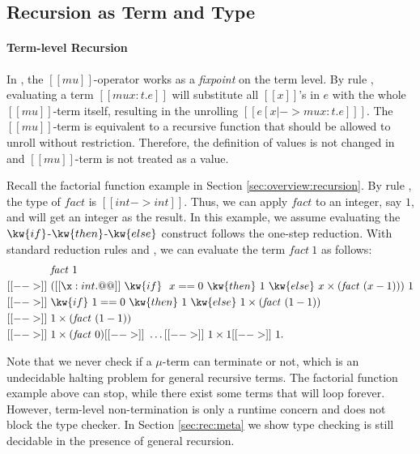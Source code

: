 \subsection{Recursion as Term and Type}
\label{sec:rec:recur}
\paragraph{Term-level Recursion}

In \name, the $[[mu]]$-operator works as a \emph{fixpoint} on the term
level. By rule , evaluating a term $[[mu x:t.e]]$ will
substitute all $[[x]]$'s in $e$ with the whole $[[mu]]$-term itself,
resulting in the unrolling $[[e [x |-> mu x:t.e] ]]$. The
$[[mu]]$-term is equivalent to a recursive function that should be
allowed to unroll without restriction. Therefore, the definition of
values is not changed in \name and $[[mu]]$-term is not treated as a
value. 

Recall the factorial function example in Section
\ref{sec:overview:recursion}.
By rule , the type of $\mathit{fact}$ is $[[int ->
    int]]$. Thus, we can apply $\mathit{fact}$ to an integer, say $1$,
and will get an integer as the result. In this example, we assume
evaluating the $\kw{if}$-$\kw{then}$-$\kw{else}$ construct follows the one-step
reduction. With standard reduction rules  and
, we can evaluate the term $\mathit{fact}~1$ as
follows:
\begin{align*}
    &\mathit{fact}~1 \\ [[-->]]~& ([[\x : int . @@]]~\kw{if}~
  ~x==0~\kw{then}~1~\kw{else}~x \times (\mathit{fact}~(x - 1)))~1
  \\ [[-->]]~ & \kw{if}~1==0~\kw{then}~1~\kw{else}~1 \times
  (\mathit{fact}~(1 - 1)) \\ [[-->]]~& 1 \times (\mathit{fact}~(1-1))
  \\ [[-->]]~& 1 \times (\mathit{fact}~0) [[-->]]~ \dots [[-->]]~ 1 \times
  1 [[-->]]~ 1. 
\end{align*}

Note that we never check if a $\mu$-term can terminate or not, which
is an undecidable halting problem for general recursive terms. The
factorial function example above can stop, while there exist some
terms that will loop forever. However, term-level non-termination is
only a runtime concern and does not block the type checker. In Section
\ref{sec:rec:meta} we show type checking \name is still decidable
in the presence of general recursion.

